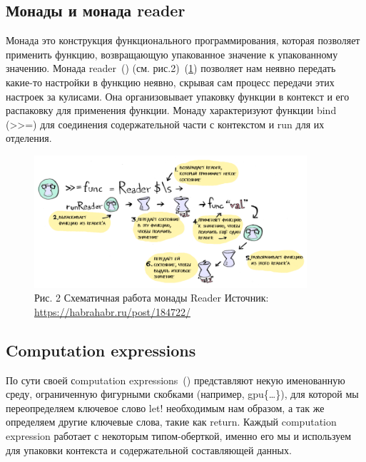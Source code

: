 \documentclass[14pt]{matmex-diploma-custom}
\begin{document}
\subsection {Монады и монада reader}
Монада это конструкция функционального программирования, которая позволяет применить функцию, возвращающую упакованное значение к упакованному значению.
Монада reader~(\cite{habrahabr}) (см. рис.2)~(\ref{reader}) позволяет нам неявно передать какие-то настройки в функцию неявно, скрывая сам процесс передачи этих настроек за кулисами. Она организовывает упаковку функции в контекст и его распаковку для применения функции. Монаду характеризуют функции bind (>>=) для соединения содержательной части с контекстом и run для их отделения.
\begin{figure}[h] 
\label{reader}
\centering 
\includegraphics[width=0.9\textwidth]{images/reader} 
\caption{Рис. 2 Схематичная работа монады Reader
Источник: \url{https://habrahabr.ru/post/184722/}
} 
\end{figure}
\subsection{Computation expressions}
По сути своей сomputation expressions~(\cite{fsffap}) представляют некую именованную среду, ограниченную фигурными скобками (например, gpu\{\ldots\}), для которой мы переопределяем ключевое слово let! необходимым нам образом, а так же определяем другие ключевые слова, такие как return. 
Каждый computation expression работает с некоторым типом-оберткой, именно его мы и используем для упаковки контекста и содержательной составляющей данных.
\end{document}

